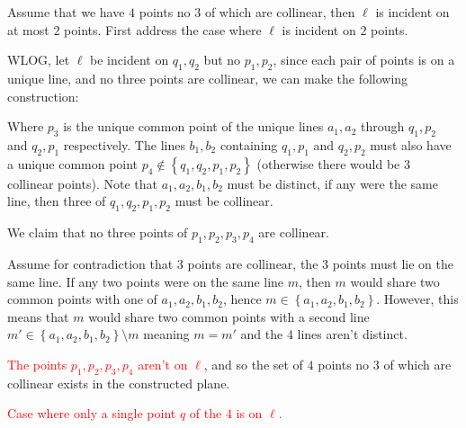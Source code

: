 \documentclass[a4paper, 11pt]{article}
\def\set#1{\left\{ #1 \right\}}
\begin{document}
\begin{itemize}
		Assume that we have $4$ points no $3$ of which are collinear, then $\ell$ is incident on at most $2$ points. First address the case where $\ell$ is incident on $2$ points. 
		
		WLOG, let $\ell$ be incident on $q_1,q_2$ but no $p_1,p_2$, since each pair of points is on a unique line, and no three points are collinear, we can make the following construction:  
		\begin{center}
		\end{center}
		Where $p_3$ is the unique common point of the unique lines $a_1,a_2$ through $q_1,p_2$ and $q_2,p_1$ respectively. The lines $b_1,b_2$ containing $q_1,p_1$ and $q_2,p_2$ must also have a unique common point $p_4\notin\set{q_1,q_2,p_1,p_2}$ (otherwise there would be $3$ collinear points). Note that $a_1,a_2,b_1,b_2$ must be distinct, if any were the same line, then three of $q_1,q_2,p_1,p_2$ must be collinear.
		
		We claim that no three points of $p_1,p_2,p_3,p_4$ are collinear. 
		
		Assume for contradiction that $3$ points are collinear, the $3$ points must lie on the same line. If any two points were on the same line $m$, then $m$ would share two common points with one of $a_1,a_2,b_1,b_2$, hence $m\in\set{a_1,a_2,b_1,b_2}$. However, this means that $m$ would share two common points with a second line $m'\in\set{a_1,a_2,b_1,b_2}\setminus m$ meaning $m=m'$ and the $4$ lines aren't distinct. 

		\textcolor{red}{The points $p_1,p_2,p_3,p_4$ aren't on $\ell$}, and so the set of $4$ points no $3$ of which are collinear exists in the constructed plane. 

		\textcolor{red}{Case where only a single point $q$ of the $4$ is on $\ell$.}
\end{itemize}
\end{document}

